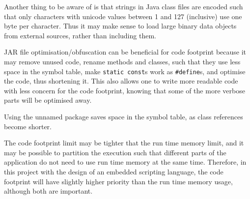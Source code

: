\documentclass[11pt]{report}
\begin{document}
Another thing to be aware of is that strings in Java class files are encoded such that only characters with unicode values between 1 and 127 (inclusive) use one byte per character. Thus it may make sense to load large binary data objects from external sources, rather than including them.

JAR file optimisation/obfuscation can be beneficial for code footprint because it may
remove unused code,
rename methods and classes, such that they use less space in the symbol table,
make \verb|static const|s work as \verb|#define|s,
 and optimise the code, thus shortening it.
This also allows one to write more readable code with less concern for the code footprint, knowing that some of the more verbose parts will be optimised away.

Using the unnamed package saves space in the symbol table, as class references become shorter.

The code footprint limit may be tighter that the run time memory limit, and it may be possible to partition the execution such that different parts of the application do not need to use run time memory at the same time.
Therefore, in this project with the design of an embedded scripting language, the code footprint will have slightly higher priority than the run time memory usage, although both are important.


\end{document}
